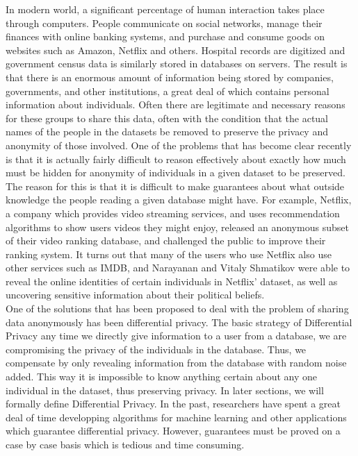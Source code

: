\documentclass[11pt]{article}
\begin{document}
In modern world, a significant percentage of human interaction takes place through computers. People communicate on  social networks, manage their finances with online banking systems, and purchase and consume goods on websites such as Amazon, Netflix and others. Hospital records are digitized and government census data is similarly stored in databases on servers. The result is that there is an enormous amount of information being stored by companies, governments, and other institutions, a great deal of which contains personal information about individuals. Often there are legitimate and necessary reasons for these groups to share this data, often with the condition that the actual names of the people in the datasets be removed to preserve the privacy and anonymity of those involved. One of the problems that has become clear recently is that it is actually fairly difficult to reason effectively about exactly how much must be hidden for anonymity of individuals in a given dataset to be preserved. The reason for this is that it is difficult to make guarantees about what outside knowledge the people reading a given database might have. For example, Netflix, a company which provides video streaming services, and uses recommendation algorithms to show users videos they might enjoy, released an anonymous subset of their video ranking database, and challenged the public to improve their ranking system. It turns out that many of the users who use Netflix also use other services such as IMDB, and Narayanan and Vitaly Shmatikov were able to reveal the online identities of certain individuals in Netflix' dataset, as well as uncovering sensitive information about their political beliefs\cite{narayanan2008}. \\

One of the solutions that has been proposed to deal with the problem of sharing data anonymously has been differential privacy\cite{dwork2008}. The basic strategy of Differential Privacy any time we directly give information to a user from a database, we are compromising the privacy of the individuals in the database. Thus, we compensate by only revealing information from the database with random noise added. This way it is impossible to know anything certain about any one individual in the dataset, thus preserving privacy. In later sections, we will formally define Differential Privacy. In the past, researchers have spent a great deal of time developping algorithms for machine learning and other applications which guarantee differential privacy. However, guarantees must be proved on a case by case basis which is tedious and time consuming. \\
\end{document}
